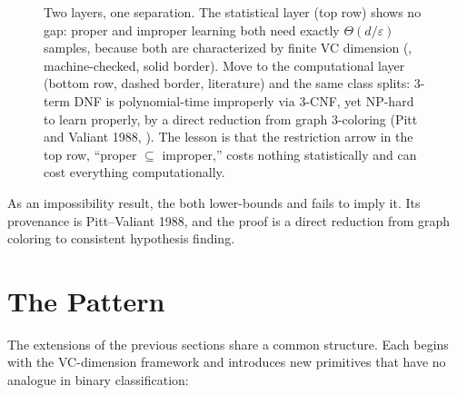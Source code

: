 \begin{figure}[ht]
\caption[Proper versus improper learning: no statistical gap, a computational
gap]{Two layers, one separation.  The statistical layer (top row) shows no
gap: proper and improper learning both need exactly $\Theta(d/\varepsilon)$
samples, because both are characterized by finite VC dimension
(, machine-checked, solid border).  Move to the
computational layer (bottom row, dashed border, literature) and the same class
splits: $3$-term DNF is polynomial-time improperly via $3$-CNF, yet NP-hard
to learn properly, by a direct reduction from graph $3$-coloring (Pitt and
Valiant 1988, ).  The lesson is that the restriction
arrow in the top row, ``proper $\subseteq$ improper,'' costs nothing
statistically and can cost everything computationally.}
\label{fig:proper-improper}
\end{figure}


As an impossibility result, the  both
lower-bounds  and fails to imply it.  Its provenance is
Pitt--Valiant 1988, and the proof is a direct reduction from graph coloring to
consistent hypothesis finding.



\section{The  Pattern}
\label{sec:extends-grammar}

The extensions of the previous sections share a common structure.  Each
begins with the VC-dimension framework and introduces new primitives that
have no analogue in binary classification:

